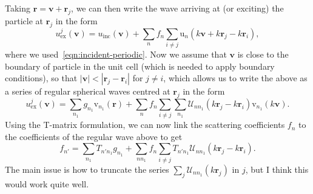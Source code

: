 \documentclass[ 12pt, a4paper]{article}
\renewcommand{\vec}[1]{\boldsymbol{#1}}
\begin{document}
Taking $\vec r = \vec v + \vec r_j$, we can then write the wave arriving at (or exciting) the particle at $\vec r_j$ in the form
\[
u^{j}_\mathrm{ex}(\vec v) = u_\mathrm{inc}(\vec v) + \sum_n f_n \sum_{i \not = j} \mathrm u_n(k \vec v + k \vec r_j - k \vec r_i),
\]
where we used~\eqref{eqn:incident-periodic}. Now we assume that $\vec v$ is close to the boundary of particle in the unit cell (which is needed to apply boundary conditions), so that $|\vec v | < |\vec r_j -  \vec r_i|$ for $j \not = i$, which allows us to write the above as a series of regular spherical waves centred at $\vec r_j$ in the form
\[
u^{j}_\mathrm{ex}(\vec v) = \sum_{n_1} g_{n_1} \mathrm v_{n_1}(\vec r) + \sum_n f_n \sum_{i \not = j} \sum_{n_1} \mathcal U_{n n_1}( k \vec r_j - k \vec r_i) \mathrm v_{n_1}(k \vec v).
\]
Using the T-matrix formulation, we can now link the scattering coefficients $f_n$ to the coefficients of the regular wave above to get
\begin{equation}
  f_{n'} =  \sum_{n_1} T_{n' n_1} g_{n_1} + \sum_{n n_1} f_n \sum_{i \not = j} T_{n' n_1} \mathcal U_{n n_1}( k \vec r_j - k \vec r_i).
\end{equation}
The main issue is how to truncate the series $ \sum_j \mathcal U_{n n_1}( k \vec r_j)$ in $j$, but I think this would work quite well.

\printbibliography
\end{document}
